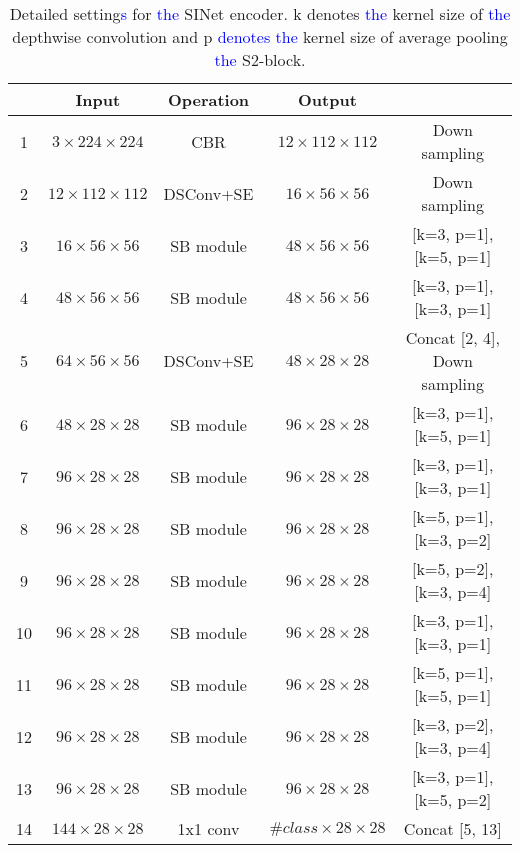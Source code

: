 \documentclass[10pt,twocolumn,letterpaper]{article}
\newcommand\Lars[1]{\textcolor{blue}{#1}}
\newcommand\Lars[1]{#1}
\begin{document}
\begin{table}[t]
\tiny
  \begin{center}
      \begin{tabular}{c|c|c|c|c}
          & Input & Operation & Output &  \\
          \hline 
    1     &  $3\times224\times224$ & CBR    & $12\times112\times112$   & Down sampling \\
    2     &  $12\times112\times112$ & DSConv+SE &  $16\times56\times56$ & Down sampling \\
    3     &  $16\times56\times56$ & SB module &  $48\times56\times56$ & [k=3, p=1], [k=5, p=1] \\
    4     & $48\times56\times56$& SB module & $48\times56\times56$ & [k=3, p=1], [k=3, p=1] \\
    5     & $64\times56\times56$ & DSConv+SE & $48\times28\times28$  & Concat [2, 4], Down sampling \\
    6     &  $48\times28\times28$ & SB module &  $96\times28\times28$ & [k=3, p=1], [k=5, p=1] \\
    7     & $96\times28\times28$ & SB module & $96\times28\times28$ & [k=3, p=1], [k=3, p=1] \\
    8     & $96\times28\times28$ & SB module & $96\times28\times28$ & [k=5, p=1], [k=3, p=2] \\
    9     & $96\times28\times28$ & SB module & $96\times28\times28$ & [k=5, p=2], [k=3, p=4] \\
    10    &$96\times28\times28$ & SB module & $96\times28\times28$ & [k=3, p=1], [k=3, p=1] \\
    11    & $96\times28\times28$ & SB module & $96\times28\times28$ & [k=5, p=1], [k=5, p=1] \\
    12    & $96\times28\times28$ & SB module & $96\times28\times28$ & [k=3, p=2], [k=3, p=4] \\
    13    & $96\times28\times28$& SB module & $96\times28\times28$ & [k=3, p=1], [k=5, p=2] \\
    14    & $144\times28\times28$& 1x1 conv & $\#class\times28\times28$ & Concat [5, 13]\\
   
    \end{tabular}\end{center}
    \caption{Detailed setting\Lars{s} for \Lars{the} SINet encoder. k denotes \Lars{the} kernel size of \Lars{the} depthwise convolution and p \Lars{denotes the} kernel size of average pooling \Lars{the} S2-block. }
  \label{tab:setting}\vspace{-3mm}
\end{table}
\end{document}
